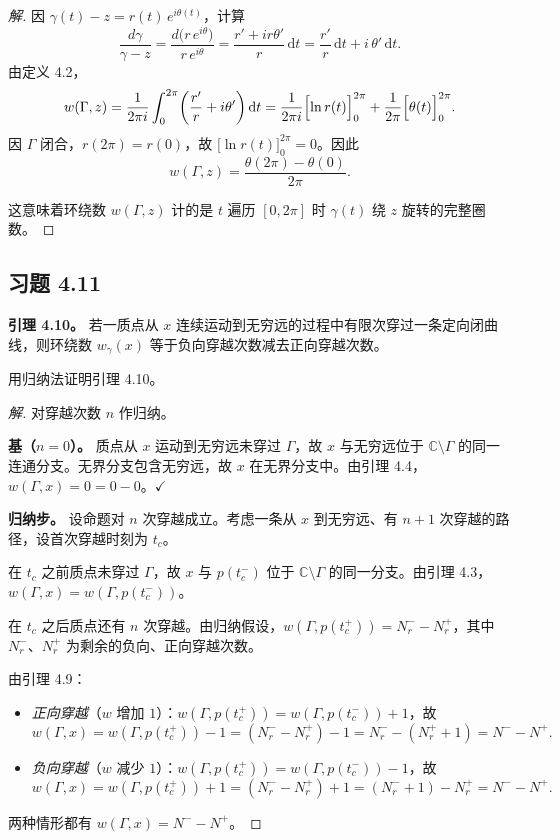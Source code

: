 \documentclass[11pt,a4paper]{article}
\newcommand{\C}{\mathbb{C}}
\newcommand{\dd}{\mathrm{d}}
\theoremstyle{definition}
\newenvironment{solution}{\begin{proof}[解]}{\end{proof}}
\begin{document}
\begin{solution}
  因 $\gamma(t) - z = r(t)\,e^{i\theta(t)}$，计算
  \[
    \frac{d\gamma}{\gamma - z}
    = \frac{d\bigl(r\,e^{i\theta}\bigr)}{r\,e^{i\theta}}
    = \frac{r' + ir\theta'}{r}\,\dd t
    = \frac{r'}{r}\,\dd t + i\,\theta'\,\dd t.
  \]
  由定义 4.2，
  \[
    w(\Gamma, z)
    = \frac{1}{2\pi i}\int_0^{2\pi}
      \!\left(\frac{r'}{r} + i\theta'\right)\dd t
    = \frac{1}{2\pi i}\Bigl[\ln r(t)\Bigr]_0^{2\pi}
      + \frac{1}{2\pi}\Bigl[\theta(t)\Bigr]_0^{2\pi}.
  \]
  因 $\Gamma$ 闭合，$r(2\pi) = r(0)$，故 $\bigl[\ln r(t)\bigr]_0^{2\pi} = 0$。因此
  \[
    w(\Gamma, z) = \frac{\theta(2\pi) - \theta(0)}{2\pi}.
  \]

  这意味着环绕数 $w(\Gamma, z)$ 计的是 $t$ 遍历 $[0, 2\pi]$ 时 $\gamma(t)$ 绕 $z$ 旋转的完整圈数。\qedhere
\end{solution}

\subsection{习题 4.11}

\textbf{引理 4.10。}
若一质点从 $x$ 连续运动到无穷远的过程中有限次穿过一条定向闭曲线，则环绕数 $w_\gamma(x)$ 等于负向穿越次数减去正向穿越次数。

用归纳法证明引理 4.10。

\begin{solution}
  对穿越次数 $n$ 作归纳。

  \textbf{基（$n = 0$）。}\;
  质点从 $x$ 运动到无穷远未穿过 $\Gamma$，故 $x$ 与无穷远位于 $\C \setminus \Gamma$ 的同一连通分支。无界分支包含无穷远，故 $x$ 在无界分支中。由引理 4.4，$w(\Gamma, x) = 0 = 0 - 0$。$\checkmark$

  \textbf{归纳步。}\;
  设命题对 $n$ 次穿越成立。考虑一条从 $x$ 到无穷远、有 $n + 1$ 次穿越的路径，设首次穿越时刻为 $t_c$。

  在 $t_c$ 之前质点未穿过 $\Gamma$，故 $x$ 与 $p(t_c^-)$ 位于 $\C \setminus \Gamma$ 的同一分支。由引理 4.3，$w(\Gamma, x) = w(\Gamma, p(t_c^-))$。

  在 $t_c$ 之后质点还有 $n$ 次穿越。由归纳假设，$w(\Gamma, p(t_c^+)) = N_r^- - N_r^+$，其中 $N_r^-$、$N_r^+$ 为剩余的负向、正向穿越次数。

  由引理 4.9：
  \begin{itemize}
    \item \textit{正向穿越}（$w$ 增加 $1$）：$w(\Gamma, p(t_c^+)) = w(\Gamma, p(t_c^-)) + 1$，故
      \[
        w(\Gamma, x) = w(\Gamma, p(t_c^+)) - 1
        = (N_r^- - N_r^+) - 1
        = N_r^- - (N_r^+ + 1)
        = N^- - N^+.
      \]
    \item \textit{负向穿越}（$w$ 减少 $1$）：$w(\Gamma, p(t_c^+)) = w(\Gamma, p(t_c^-)) - 1$，故
      \[
        w(\Gamma, x) = w(\Gamma, p(t_c^+)) + 1
        = (N_r^- - N_r^+) + 1
        = (N_r^- + 1) - N_r^+
        = N^- - N^+.
      \]
  \end{itemize}
  两种情形都有 $w(\Gamma, x) = N^- - N^+$。\qedhere
\end{solution}
\end{document}
